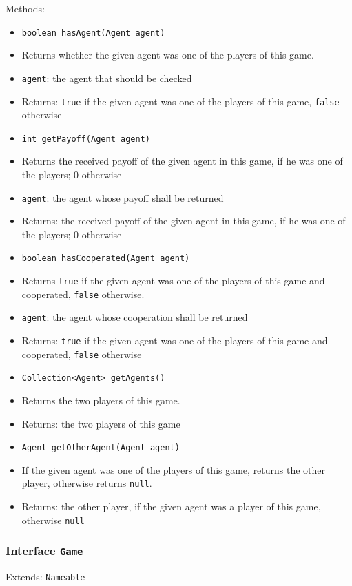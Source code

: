\documentclass[parskip=full,11pt]{scrartcl}
\begin{document}
Methods:
\begin{itemize}\itemsep -10pt
\item  \texttt{boolean hasAgent(Agent agent)}
\item[] Returns whether the given agent was one of the players of this game.
\item[] \texttt{agent}: the agent that should be checked
\item[] Returns: \texttt{true} if the given agent was one of the players of this game, \texttt{false} otherwise

\item \texttt{int getPayoff(Agent agent)}
\item[] Returns the received payoff of the given agent in this game, if he was one of the players; \(0\) otherwise
\item[] \texttt{agent}: the agent whose payoff shall be returned
\item[] Returns: the received payoff of the given agent in this game, if he was one of the players; \(0\) otherwise

\item \texttt{boolean hasCooperated(Agent agent)}
\item[] Returns \texttt{true} if the given agent was one of the players of this game and cooperated, \texttt{false} otherwise.
\item[] \texttt{agent}: the agent whose cooperation shall be returned
\item[] Returns: \texttt{true} if the given agent was one of the players of this game and cooperated, \texttt{false} otherwise

\item \texttt{Collection<Agent> getAgents()}
\item[] Returns the two players of this game.
\item[] Returns: the two players of this game

\item \texttt{Agent getOtherAgent(Agent agent)}
\item[] If the given agent was one of the players of this game, returns the other player, otherwise returns \texttt{null}.
\item[] Returns: the other player, if the given agent was a player of this game, otherwise \texttt{null}
\end{itemize}

\subsubsection{Interface \texttt{Game}}
Extends: \texttt{Nameable}
\end{document}
